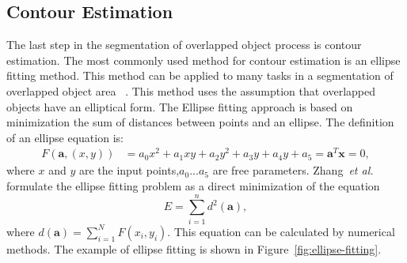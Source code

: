 \documentclass{lutmscthesis}[2010/09/22]
\begin{document}
\subsection{Contour Estimation}
\label{ContourEstimation}
The last step in the segmentation of overlapped object process is contour estimation. The most commonly used method for contour estimation is an ellipse fitting method. This method can be applied to many tasks in a segmentation of overlapped object area ~\cite{BE-FRS,Zhao2017,zafari-bb,LANGLARD2018}. This method uses the assumption that overlapped objects have an elliptical form. The Ellipse fitting approach is based on minimization the sum of distances between points and an ellipse. The definition of an ellipse equation is:
\begin{align}
    F(\textbf{a},(x,y)) &= a_0x^2 + a_1xy + a_2y^2 + a_3y + a_4y + a_5 = \textbf{a}^T \mathbf{x} = 0,
\end{align}
where $x$ and $y$ are the input points,$a_0...a_5$ are free parameters. Zhang~\emph{et al.}~\cite{acos_1} formulate the ellipse fitting problem as a  direct minimization of the equation 
\begin{equation}
    E = \sum_{i=1}^{n}d^2(\textbf{a}),
\end{equation}
where $d(\textbf{a}) = \sum_{i=1}^N{F(x_i, y_i)}$. This equation can be calculated by numerical methods.
The example of ellipse fitting is shown in Figure~\ref{fig:ellipse-fitting}.


\begin{figure}[htp]
\end{figure}
\end{document}

